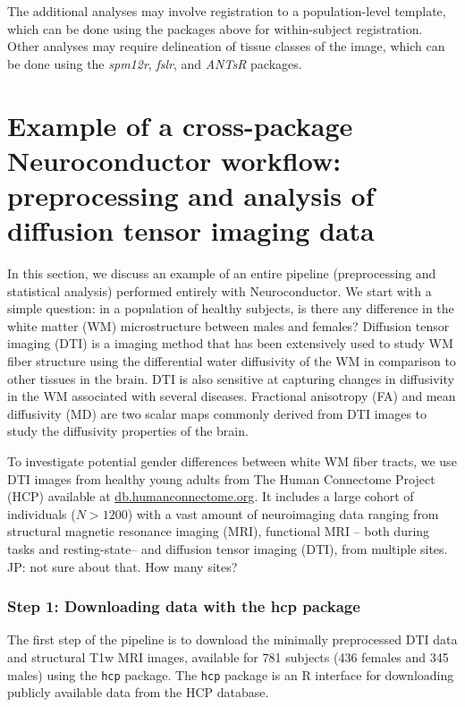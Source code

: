 \documentclass[]{elsarticle} %
\newcommand{\pkg}[1]{\emph{#1}}
\newcommand{\fixme}[1]{{\color{red} #1}}
\begin{document}
The additional analyses may involve registration to a population-level template, which can be done using the packages above for within-subject registration.  Other analyses may require delineation of tissue classes of the image, which can be done using the \pkg{spm12r}, \pkg{fslr}, and \pkg{ANTsR} packages. 

\section{Example of a cross-package Neuroconductor workflow: preprocessing and analysis of diffusion tensor imaging data}

In this section, we discuss an example of an entire pipeline (preprocessing and statistical analysis) performed entirely with Neuroconductor.  We start with a simple question: in a population of healthy subjects, is there any difference in the white matter (WM) microstructure between males and females? Diffusion tensor imaging (DTI) is a imaging method that has been extensively used to study WM fiber structure using the differential water diffusivity of the WM in comparison to other tissues in the brain. DTI is also sensitive at capturing changes in diffusivity in the WM associated with several diseases. Fractional anisotropy (FA) and mean diffusivity (MD) are two scalar maps commonly derived from DTI images to study the diffusivity properties of the brain. 

To investigate potential gender differences between white WM fiber tracts, we use DTI images from healthy young adults from The Human Connectome Project (HCP) available at \url{db.humanconnectome.org}.  It includes a large cohort of individuals ($N > 1200$) with a vast amount of neuroimaging data ranging from structural magnetic resonance imaging (MRI), functional MRI -- both during tasks and resting-state-- and diffusion tensor imaging (DTI), \fixme{from multiple sites. JP: not sure about that. How many sites? }

\subsubsection{Step 1: Downloading data with the hcp package}
The first step of the pipeline is to download the minimally preprocessed DTI data \citep{hcpminimal} and structural T1w MRI images, available  for 781 subjects (436 females and 345 males) using the \texttt{hcp} \citep{hcp} package.  The \texttt{hcp} package is an R interface for downloading publicly available data from the HCP database. 
\end{document}
